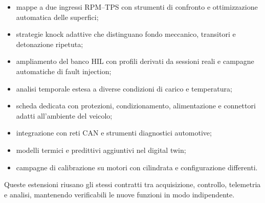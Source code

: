 \documentclass{article}
\begin{document}
\begin{itemize}
    \item mappe a due ingressi RPM--TPS con strumenti di confronto e
          ottimizzazione automatica delle superfici;
    \item strategie knock adattive che distinguano fondo meccanico, transitori
          e detonazione ripetuta;
    \item ampliamento del banco HIL con profili derivati da sessioni reali e
          campagne automatiche di fault injection;
    \item analisi temporale estesa a diverse condizioni di carico e temperatura;
    \item scheda dedicata con protezioni, condizionamento, alimentazione e
          connettori adatti all'ambiente del veicolo;
    \item integrazione con reti CAN e strumenti diagnostici automotive;
    \item modelli termici e predittivi aggiuntivi nel digital twin;
    \item campagne di calibrazione su motori con cilindrata e configurazione
          differenti.
\end{itemize}

Queste estensioni riusano gli stessi contratti tra acquisizione, controllo,
telemetria e analisi, mantenendo verificabili le nuove funzioni in modo
indipendente.
\end{document}
